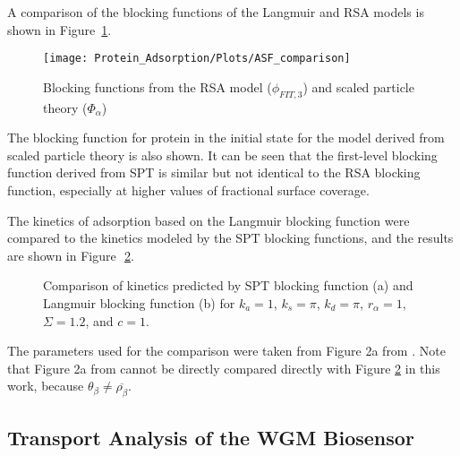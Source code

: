 A comparison of the blocking functions of the Langmuir and RSA models
is shown in Figure~\ref{fig:Blocking function comparison}.%
\begin{figure}
\texttt{[image: Protein\_Adsorption/Plots/ASF\_comparison]}

\caption{\label{fig:Blocking function comparison}Blocking functions from the
RSA model ($\phi_{FIT,3}$) and scaled particle theory ($\Phi_{\alpha}$)}
%
\end{figure}
 The blocking function for protein in the initial state for the model
derived from scaled particle theory is also shown. It can be seen
that the first-level blocking function derived from SPT is similar
but not identical to the RSA blocking function, especially at higher
values of fractional surface coverage.

The kinetics of adsorption based on the Langmuir blocking function
were compared to the kinetics modeled by the SPT blocking functions,
and the results are shown in Figure~\,\ref{fig:SPT vs Langmuir kinetics}.
%
\begin{figure}[h]

\caption{\label{fig:SPT vs Langmuir kinetics}Comparison of kinetics predicted
by SPT blocking function (a) and Langmuir blocking function (b) for
$k_{a}=1$, $k_{s}=\pi$, $k_{d}=\pi$, $r_{\alpha}=1$, $\Sigma=1.2$,
and $c=1$.}
%
\end{figure}
 The parameters used for the comparison were taken from Figure 2a
from \cite{Brusatori1999}. Note that Figure 2a from \cite{Brusatori1999}
cannot be directly compared directly with Figure \ref{fig:SPT vs Langmuir kinetics}
in this work, because $\theta_{\beta}\neq\overline{\rho_{\beta}}$.


\subsection{Transport Analysis of the WGM Biosensor}

